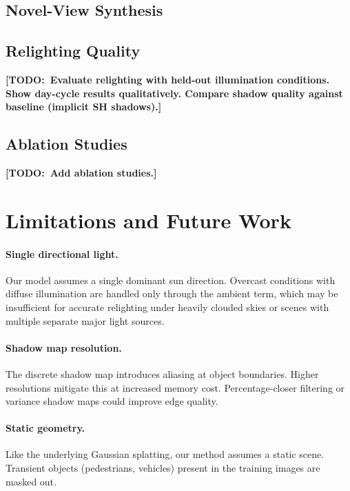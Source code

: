 \documentclass[conference]{IEEEtran}
\newcommand{\todo}[1]{{\color{red}\textbf{[TODO:~#1]}}}
\begin{document}
\subsection{Novel-View Synthesis}


\subsection{Relighting Quality}

\todo{Evaluate relighting with held-out illumination conditions. Show day-cycle results qualitatively. Compare shadow quality against baseline (implicit SH shadows).}

\subsection{Ablation Studies}

\todo{Add ablation studies.}

\section{Limitations and Future Work}
\label{sec:limitations}

\paragraph{Single directional light.}
Our model assumes a single dominant sun direction.
Overcast conditions with diffuse illumination are handled only through the ambient term, which may be insufficient for accurate relighting under heavily clouded skies or scenes with multiple separate major light sources.

\paragraph{Shadow map resolution.}
The discrete shadow map introduces aliasing at object boundaries.
Higher resolutions mitigate this at increased memory cost.
Percentage-closer filtering or variance shadow maps could improve edge quality.

\paragraph{Static geometry.}
Like the underlying Gaussian splatting, our method assumes a static scene.
Transient objects (pedestrians, vehicles) present in the training images are masked out.
\end{document}
